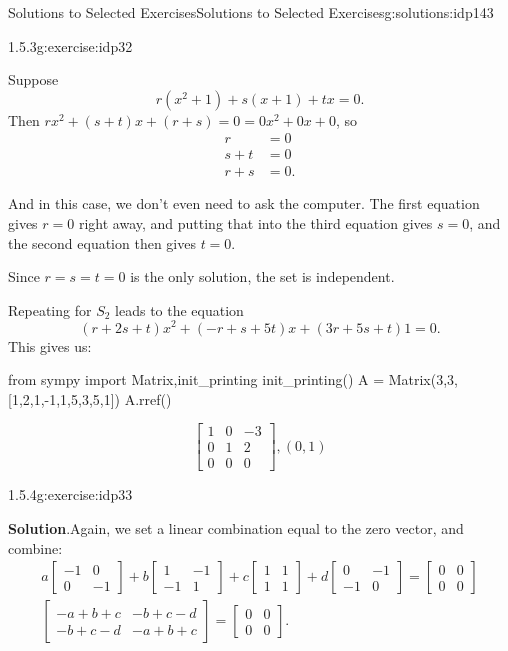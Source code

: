 \documentclass[oneside,10pt,]{book}
\newcommand{\blocktitlefont}{\relax}
\numberwithin{equation}{section}
\newcommand{\bbm}{\begin{bmatrix}}
\newcommand{\ebm}{\end{bmatrix}}
\newcommand{\amp}{&}
\begin{document}
\begin{solutions-chapter}{Solutions to Selected Exercises}{}{Solutions to Selected Exercises}{}{}{g:solutions:idp143}
\begin{inlinesolution}{1.5.3}{}{g:exercise:idp32}
\par
Suppose%
\begin{equation*}
r(x^2+1)+s(x+1)+tx = 0\text{.}
\end{equation*}
Then \(rx^2+(s+t)x+(r+s)=0=0x^2+0x+0\), so%
\begin{align*}
r \amp =0\\
s+t \amp =0\\
r+s\amp =0\text{.}
\end{align*}
%
\par
And in this case, we don't even need to ask the computer. The first equation gives \(r=0\) right away, and putting that into the third equation gives \(s=0\), and the second equation then gives \(t=0\).%
\par
Since \(r=s=t=0\) is the only solution, the set is independent.%
\par
Repeating for \(S_2\) leads to the equation%
\begin{equation*}
(r+2s+t)x^2+(-r+s+5t)x+(3r+5s+t)1=0.
\end{equation*}
This gives us:%
\begin{sageinput}
from sympy import Matrix,init_printing
init_printing()
A = Matrix(3,3,[1,2,1,-1,1,5,3,5,1])
A.rref()
\end{sageinput}
\begin{sageoutput}
\[\bbm 1\amp 0\amp -3\\0\amp 1\amp 2\\0\amp 0\amp 0\ebm, (0,1)\]
\end{sageoutput}
\end{inlinesolution}%
\begin{inlinesolution}{1.5.4}{}{g:exercise:idp33}%
\par\smallskip%
\noindent\textbf{\blocktitlefont Solution}.\hypertarget{g:solution:idp149-back}{}\quad{}Again, we set a linear combination equal to the zero vector, and combine:%
\begin{align*}
a\bbm -1\amp 0\\0\amp -1\ebm +b\bbm 1\amp -1\\ -1\amp 1\ebm
+c\bbm 1\amp 1\\1\amp 1\ebm +d \bbm 0\amp -1\\-1\amp 0\ebm = \bbm 0\amp 0\\ 0\amp 0\ebm\\
\bbm -a+b+c\amp -b+c-d\\-b+c-d\amp -a+b+c\ebm = \bbm 0\amp 0\\0\amp 0\ebm\text{.}
\end{align*}

\end{inlinesolution}
\end{solutions-chapter}
\end{document}
